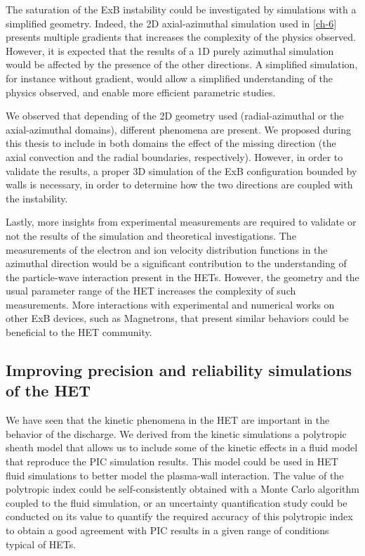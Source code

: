     The saturation of the ExB instability could be investigated by simulations with a simplified geometry.
    Indeed, the 2D axial-azimuthal simulation used in \cref{ch-6} presents multiple gradients that increases the complexity of the physics observed.
    However, it is expected that the results of a 1D purely azimuthal simulation would be affected by the presence of the other directions.
    A simplified simulation, for instance without gradient, would allow a simplified understanding of the physics observed, and enable more efficient parametric studies.

    We observed that depending of the 2D geometry used (radial-azimuthal or the axial-azimuthal domains), different phenomena are present.
    We proposed during this thesis to include in both domains the effect of the missing direction (the axial convection and the radial boundaries, respectively).
    However, in order to validate the results, a proper 3D simulation of the ExB configuration bounded by walls is necessary, in order to determine how the two directions are coupled with the instability.

    Lastly, more insights from experimental measurements are required to validate or not the results of the simulation and theoretical investigations.
    The measurements of the electron and ion velocity distribution functions in the azimuthal direction would be a significant contribution to the understanding of the particle-wave interaction present in the HETs.
    However, the geometry and the usual parameter range of the HET increases the complexity of such measurements.
    More interactions with experimental and numerical works on other ExB devices, such as Magnetrons, that present similar behaviors could be beneficial to the HET community.

  \subsection{Improving precision and reliability simulations of the HET}

    We have seen that the kinetic phenomena in the HET are important in the behavior of the discharge.
    We derived from the kinetic simulations a polytropic sheath model that allows us to include some of the kinetic effects in a fluid model that reproduce the PIC simulation results.
    This model could be used in HET fluid simulations to better model the plasma-wall interaction.
    The value of the polytropic index could be self-consistently obtained with a Monte Carlo algorithm coupled to the fluid simulation, or an uncertainty quantification study could be conducted on its value  to quantify the required accuracy of this polytropic index to obtain a good agreement with PIC results in a given range of conditions typical of HETs.


